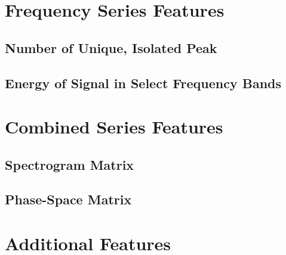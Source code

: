 \documentclass[12pt,letterpaper]{article}
\begin{document}



\section{Frequency Series Features}


\subsection{Number of Unique, Isolated Peak}


\subsection{Energy of Signal in Select Frequency Bands}





\section{Combined Series Features}


\subsection{Spectrogram Matrix}


\subsection{Phase-Space Matrix}





\section{Additional Features}
\end{document}
